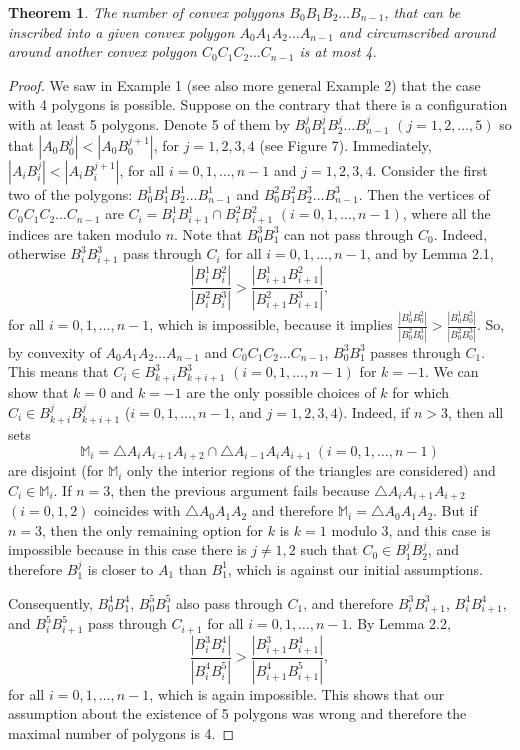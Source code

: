 \documentclass{birkjour}
\newtheorem{theorem}{Theorem}[section]
\theoremstyle{definition}
\theoremstyle{remark}
\numberwithin{equation}{section}
\begin{document}
\begin{theorem}
The number of convex polygons $B_0 B_1 B_2\ldots B_{n-1}$, that can be inscribed into a given convex polygon $A_0 A_1 A_2\ldots A_{n-1}$ and circumscribed around around another convex polygon $C_0 C_1 C_2\dots C_{n-1}$ is at most 4.
\end{theorem}

\begin{proof}
We saw in Example 1 (see also more general Example 2) that the case with 4 polygons is possible. Suppose on the contrary that there is a configuration with at least 5 polygons. Denote 5 of them by $B^j_0 B^j_1 B^j_2\ldots B^j_{n-1}$ $(j=1,2,\ldots,5)$ so that $|A_0B^j_0|<|A_0B^{j+1}_0|$, for $j=1,2,3,4$ (see Figure 7). Immediately, $|A_iB^j_i|<|A_iB^{j+1}_i|$, for all $i=0,1,\ldots,n-1$ and $j=1,2,3,4$. Consider the first two of the polygons: $B^1_0 B^1_1 B^1_2\ldots B^1_{n-1}$ and $B^{2}_0 B^{2}_1 B^{3}_2\ldots B^{3}_{n-1}$.
Then the vertices of $C_0 C_1 C_2\dots C_{n-1}$ are $C_i=B^1_iB^1_{i+1}\cap B^{2}_iB^{2}_{i+1}$ $(i=0,1,\ldots,n-1)$, where all the indices are taken modulo $n$. Note that $B^{3}_0 B^{3}_1$ can not pass through $C_0$. Indeed, otherwise $B^{3}_i B^{3}_{i+1}$ pass through $C_i$ for all $i=0,1,\ldots,n-1$, and by Lemma 2.1,
$$
\frac{|B^1_iB^2_i|}{|B^2_iB^3_i|}>\frac{|B^1_{i+1}B^2_{i+1}|}{|B^2_{i+1}B^3_{i+1}|},
$$
for all $i=0,1,\ldots,n-1$, which is impossible, because it implies $
\frac{|B^1_0B^2_0|}{|B^2_0B^3_0|}>\frac{|B^1_0B^2_0|}{|B^2_0B^3_0|}.
$
So, by convexity of $A_0 A_1 A_2\ldots A_{n-1}$ and $C_0 C_1 C_2\dots C_{n-1}$, $B^{3}_0 B^{3}_1$ passes through $C_1$. This means that $C_i\in B^{3}_{k+i} B^{3}_{k+i+1}$ $(i=0,1,\ldots,n-1)$ for $k=-1$. We can show that $k=0$ and $k=-1$ are the only possible choices of $k$ for which $C_i\in B^{j}_{k+i} B^{j}_{k+i+1}$ ($i=0,1,\ldots,n-1$, and $j=1,2,3,4$).
Indeed, if $n>3$, then all sets $$\mathbb{M}_i=\triangle A_iA_{i+1}A_{i+2}\cap \triangle A_{i-1}A_iA_{i+1}\ (i=0,1,\ldots,n-1)$$ are disjoint (for $\mathbb{M}_i$ only the interior regions of the triangles are considered) and $C_i\in \mathbb{M}_i$. If $n=3$, then the previous argument fails because $\triangle A_iA_{i+1}A_{i+2}$ $(i=0,1,2)$ coincides with $\triangle A_0A_{1}A_{2}$ and therefore $\mathbb{M}_i=\triangle A_0A_{1}A_{2}$. 
But if $n=3$, then the only remaining option for $k$ is $k=1$ modulo 3, and this case is impossible because in this case there is $j\ne 1,2$ such that $C_0\in B^{j}_{1} B^{j}_{2}$, and therefore $B^{j}_{1}$ is closer to $A_1$ than $B^{1}_{1}$, which is against our initial assumptions.

Consequently, $B^{4}_{0} B^{4}_1$, $B^{5}_{0} B^{5}_1$ also pass through $C_{1}$, and therefore $B^{3}_i B^{3}_{i+1}$, $B^{4}_i B^{4}_{i+1}$, and $B^{5}_i B^{5}_{i+1}$ pass through $C_{i+1}$ for all $i=0,1,\ldots,n-1$.
By Lemma 2.2,
$$
\frac{|B^3_{i}B^4_{i}|}{|B^4_{i}B^5_{i}|}>\frac{|B^3_{i+1}B^4_{i+1}|}{|B^4_{i+1}B^5_{i+1}|},
$$
for all $i=0,1,\ldots,n-1$, which is again impossible.
This shows that our assumption about the existence of 5 polygons was wrong and therefore the maximal number of polygons is 4.
\end{proof}
\end{document}
